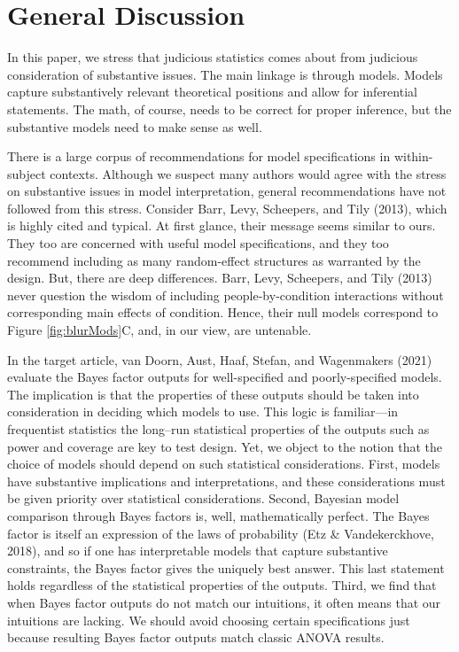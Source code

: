 \documentclass[
  english,
  ,man]{apa6}
\begin{document}
\hypertarget{general-discussion}{%
\section{General Discussion}\label{general-discussion}}

In this paper, we stress that judicious statistics comes about from judicious consideration of substantive issues. The main linkage is through models. Models capture substantively relevant theoretical positions and allow for inferential statements. The math, of course, needs to be correct for proper inference, but the substantive models need to make sense as well.

There is a large corpus of recommendations for model specifications in within-subject contexts. Although we suspect many authors would agree with the stress on substantive issues in model interpretation, general recommendations have not followed from this stress. Consider Barr, Levy, Scheepers, and Tily (2013), which is highly cited and typical. At first glance, their message seems similar to ours. They too are concerned with useful model specifications, and they too recommend including as many random-effect structures as warranted by the design. But, there are deep differences. Barr, Levy, Scheepers, and Tily (2013) never question the wisdom of including people-by-condition interactions without corresponding main effects of condition. Hence, their null models correspond to Figure \ref{fig:blurMods}C, and, in our view, are untenable.

In the target article, van Doorn, Aust, Haaf, Stefan, and Wagenmakers (2021) evaluate the Bayes factor outputs for well-specified and poorly-specified models. The implication is that the properties of these outputs should be taken into consideration in deciding which models to use. This logic is familiar---in frequentist statistics the long--run statistical properties of the outputs such as power and coverage are key to test design. Yet, we object to the notion that the choice of models should depend on such statistical considerations. First, models have substantive implications and interpretations, and these considerations must be given priority over statistical considerations. Second, Bayesian model comparison through Bayes factors is, well, mathematically perfect. The Bayes factor is itself an expression of the laws of probability (Etz \& Vandekerckhove, 2018), and so if one has interpretable models that capture substantive constraints, the Bayes factor gives the uniquely best answer. This last statement holds regardless of the statistical properties of the outputs. Third, we find that when Bayes factor outputs do not match our intuitions, it often means that our intuitions are lacking. We should avoid choosing certain specifications just because resulting Bayes factor outputs match classic ANOVA results.
\end{document}
